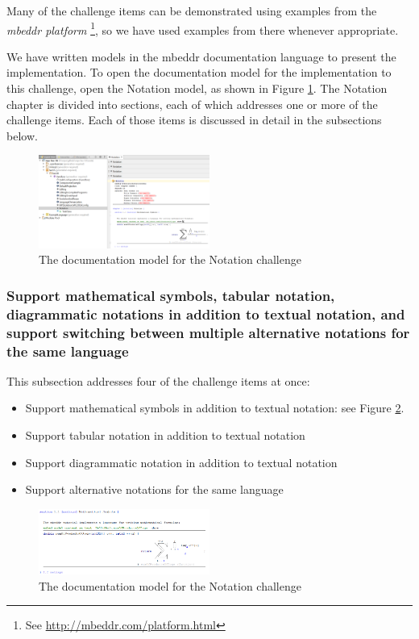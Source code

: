 \documentclass[preprint,numbers,10pt]{sigplanconf}
\begin{document}
Many of the challenge items can be demonstrated using examples from the \emph{mbeddr platform} \footnote{See \url{http://mbeddr.com/platform.html}}, so we have used examples from there whenever appropriate.

We have written models in the mbeddr documentation language to present the implementation. To open the documentation model for the implementation to this challenge, open the Notation model, as shown in Figure \ref{fig:opennotation}. The Notation chapter is divided into sections, each of which addresses one or more of the challenge items. Each of those items is discussed in detail in the subsections below.

\begin{figure}[p]
	\centering
	\includegraphics[width=0.50\textwidth]{screens/OpenNotation.png}
	\caption{The documentation model for the Notation challenge}
	\label{fig:opennotation}
\end{figure}

\subsubsection{Support mathematical symbols, tabular notation, diagrammatic notations in addition to textual notation, and support switching between multiple alternative notations for the same language}
This subsection addresses four of the challenge items at once:
\begin{itemize}
	\item Support mathematical symbols in addition to textual notation: see Figure \ref{fig:mathnotation}.
	\item Support tabular notation in addition to textual notation
	\item Support diagrammatic notation in addition to textual notation
	\item Support alternative notations for the same language
\end{itemize}

\begin{figure}[p]
	\centering
	\includegraphics[width=0.50\textwidth]{screens/MathematicalNotation.png}
	\caption{The documentation model for the Notation challenge}
	\label{fig:mathnotation}
\end{figure}
\end{document}
